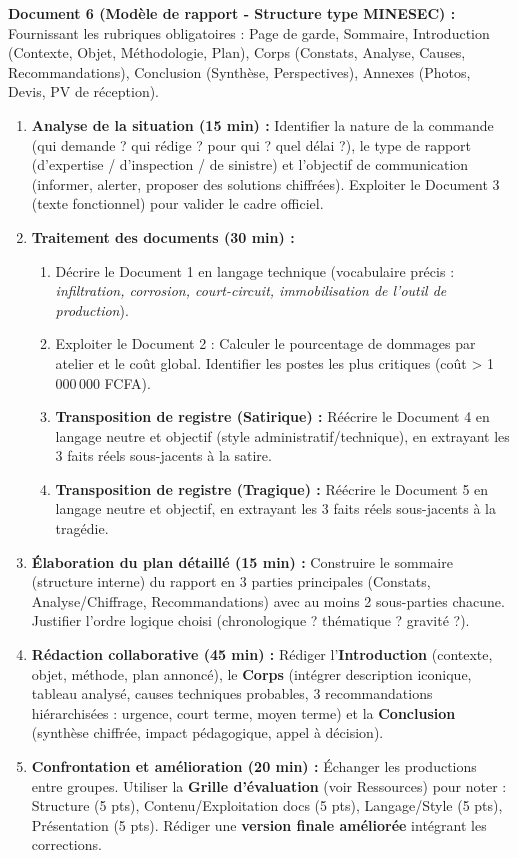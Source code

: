 \documentclass[11pt]{article}
\newcommand{\cle}[1]{{\popxbold\color{popdark}#1}}
\newcounter{popsec}
\newcounter{popsub}
\newcommand{\courssub}[1]{%
  \stepcounter{popsub}%
  \par\vspace{9pt}\noindent{\popxbold\fontsize{11.5}{13}\selectfont\color{popink}{\color{poporange}\thepopsec.\thepopsub}\hspace{6pt}#1}\par\nopagebreak\vspace{4pt}
}
\begin{document}
\textbf{Document 6 (Modèle de rapport - Structure type MINESEC) :} Fournissant les rubriques obligatoires : Page de garde, Sommaire, Introduction (Contexte, Objet, Méthodologie, Plan), Corps (Constats, Analyse, Causes, Recommandations), Conclusion (Synthèse, Perspectives), Annexes (Photos, Devis, PV de réception).

\courssub{Consignes}
\begin{enumerate}
    \item \textbf{Analyse de la situation (15 min) :} Identifier la \cle{nature de la commande} (qui demande ? qui rédige ? pour qui ? quel délai ?), le \cle{type de rapport} (d'expertise / d'inspection / de sinistre) et l'\cle{objectif de communication} (informer, alerter, proposer des solutions chiffrées). Exploiter le Document 3 (texte fonctionnel) pour valider le cadre officiel.
    \item \textbf{Traitement des documents (30 min) :}
    \begin{enumerate}
        \item Décrire le Document 1 en langage technique (vocabulaire précis : \emph{infiltration, corrosion, court-circuit, immobilisation de l'outil de production}).
        \item Exploiter le Document 2 : Calculer le pourcentage de dommages par atelier et le coût global. Identifier les postes les plus critiques (coût \textgreater{} 1\,000\,000 FCFA).
        \item \textbf{Transposition de registre (Satirique) :} Réécrire le Document 4 en \cle{langage neutre et objectif} (style administratif/technique), en extrayant les 3 faits réels sous-jacents à la satire.
        \item \textbf{Transposition de registre (Tragique) :} Réécrire le Document 5 en \cle{langage neutre et objectif}, en extrayant les 3 faits réels sous-jacents à la tragédie.
    \end{enumerate}
    \item \textbf{Élaboration du plan détaillé (15 min) :} Construire le sommaire (structure interne) du rapport en 3 parties principales (Constats, Analyse/Chiffrage, Recommandations) avec au moins 2 sous-parties chacune. Justifier l'ordre logique choisi (chronologique ? thématique ? gravité ?).
    \item \textbf{Rédaction collaborative (45 min) :} Rédiger l'\textbf{Introduction} (contexte, objet, méthode, plan annoncé), le \textbf{Corps} (intégrer description iconique, tableau analysé, causes techniques probables, 3 recommandations hiérarchisées : urgence, court terme, moyen terme) et la \textbf{Conclusion} (synthèse chiffrée, impact pédagogique, appel à décision).
    \item \textbf{Confrontation et amélioration (20 min) :} Échanger les productions entre groupes. Utiliser la \textbf{Grille d'évaluation} (voir Ressources) pour noter : Structure (5 pts), Contenu/Exploitation docs (5 pts), Langage/Style (5 pts), Présentation (5 pts). Rédiger une \textbf{version finale améliorée} intégrant les corrections.
\end{enumerate}
\end{document}
